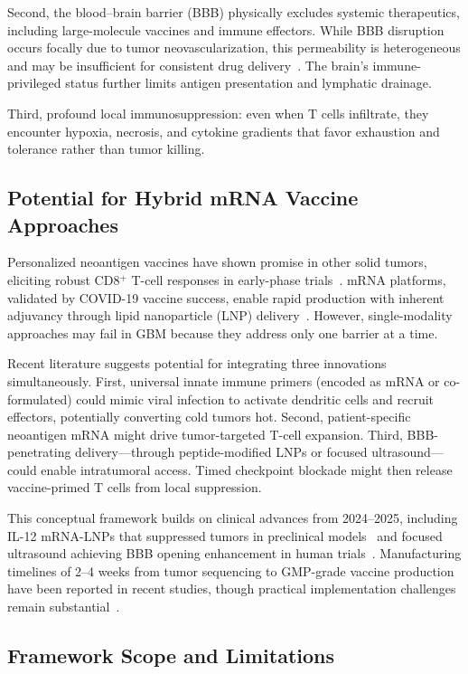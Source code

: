 \documentclass[12pt]{article}
\begin{document}
Second, the blood--brain barrier (BBB) physically excludes systemic therapeutics, including large-molecule vaccines and immune effectors. While BBB disruption occurs focally due to tumor neovascularization, this permeability is heterogeneous and may be insufficient for consistent drug delivery~\citep{lim2024}. The brain's immune-privileged status further limits antigen presentation and lymphatic drainage.

Third, profound local immunosuppression: even when T cells infiltrate, they encounter hypoxia, necrosis, and cytokine gradients that favor exhaustion and tolerance rather than tumor killing.

\subsection{Potential for Hybrid mRNA Vaccine Approaches}
Personalized neoantigen vaccines have shown promise in other solid tumors, eliciting robust CD8$^+$ T-cell responses in early-phase trials~\citep{hilf2024}. mRNA platforms, validated by COVID-19 vaccine success, enable rapid production with inherent adjuvancy through lipid nanoparticle (LNP) delivery~\citep{oloruntimehin2025}. However, single-modality approaches may fail in GBM because they address only one barrier at a time.

Recent literature suggests potential for integrating three innovations simultaneously. First, universal innate immune primers (encoded as mRNA or co-formulated) could mimic viral infection to activate dendritic cells and recruit effectors, potentially converting cold tumors hot. Second, patient-specific neoantigen mRNA might drive tumor-targeted T-cell expansion. Third, BBB-penetrating delivery—through peptide-modified LNPs or focused ultrasound—could enable intratumoral access. Timed checkpoint blockade might then release vaccine-primed T cells from local suppression.

This conceptual framework builds on clinical advances from 2024--2025, including IL-12 mRNA-LNPs that suppressed tumors in preclinical models~\citep{aunins2025,tapescu2024} and focused ultrasound achieving BBB opening enhancement in human trials~\citep{manfredi2024,chen2024fus}. Manufacturing timelines of 2--4 weeks from tumor sequencing to GMP-grade vaccine production have been reported in recent studies, though practical implementation challenges remain substantial~\citep{wang2025,hilf2024}.

\subsection{Framework Scope and Limitations}
\end{document}
